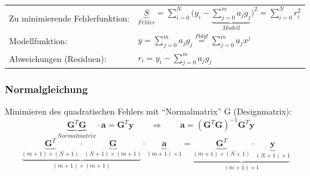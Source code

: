 \begin{minipage}[c]{12.5cm}
	\begin{tabular}{ll}
		Zu minimierende Fehlerfunktion:
		&$\boxed{\underbrace{S}_{Fehler}=\sum\limits_{i=0}^{N}{\big(y_i - \underbrace{\sum\limits_{j=0}^{m}{a_j g_j}}_{Modell}\big)^2} = \sum\limits_{i=0}^{N}{ r_i^2}}$\\
		Modellfunktion:
		&$\boxed{y=\sum\limits_{j=0}^{m}{a_j g_j}}\overset{Poly!}{=}\sum\limits_{j=0}^{m}{a_j x^j}$\\
		Abweichungen (Residuen):
		&$r_i=y_i-\sum\limits_{j=0}^{m}{a_j g_j}$
	\end{tabular}

	\subsubsection{Normalgleichung}

	Minimieren des quadratischen Fehlers mit "`Normalmatrix"' G (Designmatrix):
	$$\underbrace{\bm{G}^T \bm{G}}_{Normalmatrix}\cdot \bm{a} = \bm{G}^T \bm{y} \qquad \Rightarrow \qquad \bm{a}=(\bm{G}^T \bm{G})^{-1}\bm{G}^T \bm{y}$$
	$$\underbrace{\underbrace{\bm{G}^T}_{(m+1)\times(N+1)} \cdot \underbrace{\bm{G}}_{(N+1)\times(m+1)}}_{(m+1)\times(m+1)}\cdot
	  \underbrace{\bm{a}}_{(m+1)\times 1}=
	  \underbrace{\underbrace{\bm{G}^T}_{(m+1)\times(N+1)}\cdot\underbrace{\bm{y}}_{(N+1)\times 1}}_{(m+1)\times 1}$$
\end{minipage}
\hfill
